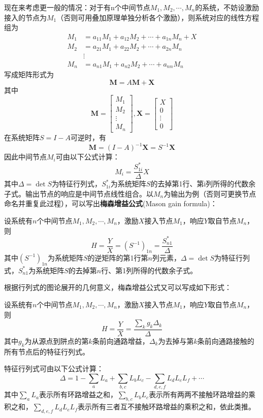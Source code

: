 现在来考虑更一般的情况：对于有n个中间节点$M_1,M_2,\cdots,M_n$的系统，不妨设激励接入的节点为$M_1$（否则可用叠加原理单独分析各个激励），则系统对应的线性方程组为\begin{align*}
    M_1&=a_{11} M_1 + a_{12} M_2 + \cdots + a_{1n} M_n + X\\
    M_2&=a_{21} M_1 + a_{22} M_2 + \cdots + a_{2n} M_n\\
    &\vdots\\
    M_n&=a_{n1} M_1 + a_{n2} M_2 + \cdots + a_{nn} M_n
\end{align*}
写成矩阵形式为
\[\mathbf{M}=A\mathbf{M}+\mathbf{X}\]
其中$$\mathbf{M}=\begin{bmatrix}
    M_1 \\
    M_2 \\
    \vdots \\
    M_n
\end{bmatrix},\mathbf{X}=\begin{bmatrix}
    X \\
    0 \\
    \vdots \\
    0
\end{bmatrix}$$
在系统矩阵$S=I-A$可逆时，有
\[\mathbf{M}=(I-A)^{-1}\mathbf{X}=S^{-1}\mathbf{X}\]
因此中间节点$M_i$可由以下公式计算：\[M_i=\frac{S^*_{1i}}{\Delta} X\]
其中$\Delta=\det S$为特征行列式，$S^*_{1i}$为系统矩阵$S$的去掉第1行、第i列所得的代数余子式。输出节点的响应是中间节点线性组合。以$M_n$为输出为例（否则可更换节点命名并重复此过程），可以写出\textbf{梅森增益公式}(Mason gain formula)：
\begin{theorem}[梅森增益公式]
    设系统有$n$个中间节点$M_1,M_2,\cdots,M_n$，激励$X$接入节点$M_1$，响应$Y$取自节点$M_n$，则
    \[H=\frac{Y}{X}=(S^{-1})_{1n}=\frac{S^*_{n1}}{\Delta}\]
    其中$(S^{-1})_{1n}$为系统矩阵$S$的逆矩阵的第1行第$n$列元素，$\Delta=\det S$为特征行列式，$S^*_{n1}$为系统矩阵$S$的去掉第$n$行、第1列所得的代数余子式。
\end{theorem}

根据行列式的图论展开的几何意义，梅森增益公式又可以写成如下形式：
\begin{theorem}
    设系统有$n$个中间节点$M_1,M_2,\cdots,M_n$，激励$X$接入节点$M_1$，响应$Y$取自节点$M_n$，则
    \[H=\frac{Y}{X}=\frac{\sum_{k}g_k\Delta_k}{\Delta}\]
    其中$g_k$为从源点到阱点的第$k$条前向通路增益，$\Delta_k$为去掉与第$k$条前向通路接触的所有节点后的特征行列式。

    特征行列式可由以下公式计算：
    $$\Delta=1-\sum_a L_a+\sum_{b,c}L_b L_c-\sum_{d,e,f}L_d L_e L_f+\cdots$$
    其中$\sum_a L_a$表示所有环路增益之和，$\sum_{b,c}L_b L_c$表示所有两两不接触环路增益的乘积之和，$\sum_{d,e,f}L_d L_e L_f$表示所有三者互不接触环路增益的乘积之和，依此类推。
\end{theorem}

